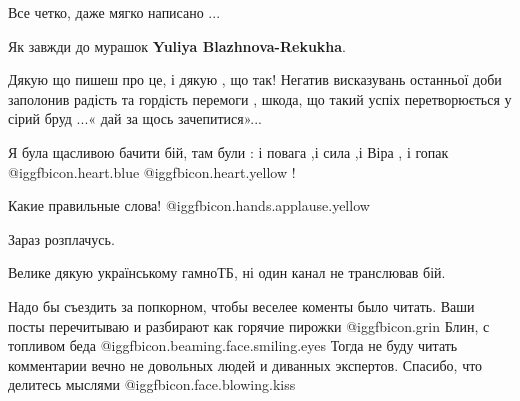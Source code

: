 \begin{itemize}
\begin{itemize}
\end{itemize} %

Все четко, даже мягко написано
...


Як завжди до мурашок \textbf{Yuliya Blazhnova-Rekukha}.

Дякую що пишеш про це, і дякую , що так! Негатив висказувань останньої доби
заполонив радість та гордість перемоги , шкода, що такий успіх перетворюється у
сірий бруд ...« дай за щось зачепитися»...

Я була щасливою бачити бій, там були : і повага ,і сила ,і Віра , і гопак
@igg{fbicon.heart.blue}  @igg{fbicon.heart.yellow} !

Какие правильные слова!  @igg{fbicon.hands.applause.yellow} 

Зараз розплачусь.

Велике дякую українському гамноТБ, ні один канал не транслював бій.

Надо бы съездить за попкорном, чтобы веселее коменты было читать. Ваши посты перечитываю и разбирают как горячие пирожки  @igg{fbicon.grin} 
Блин, с топливом беда  @igg{fbicon.beaming.face.smiling.eyes} 
Тогда не буду читать комментарии вечно не довольных людей и диванных экспертов.
Спасибо, что делитесь мыслями  @igg{fbicon.face.blowing.kiss} 


\end{itemize} %
